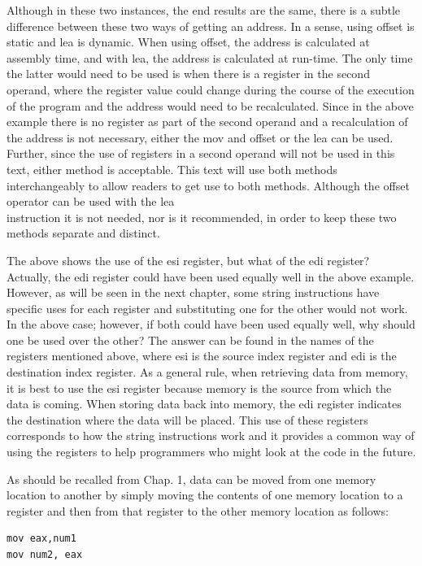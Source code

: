 \documentclass[10pt]{book}
\begin{document}
Although in these two instances, the end results are the same, there is a subtle difference between these two ways of getting an address. In a sense, using offset is static and lea is dynamic. When using offset, the address is calculated at assembly time, and with lea, the address is calculated at run-time. The only time the latter would need to be used is when there is a register in the second operand, where the register value could change during the course of the execution of the program and the address would need to be recalculated. Since in the above example there is no register as part of the second operand and a recalculation of the address is not necessary, either the mov and offset or the lea can be used. Further, since the use of registers in a second operand will not be used in this text, either method is acceptable. This text will use both methods interchangeably to allow readers to get use to both methods. Although the offset operator can be used with the lea\\
instruction it is not needed, nor is it recommended, in order to keep these two methods separate and distinct.

The above shows the use of the esi register, but what of the edi register? Actually, the edi register could have been used equally well in the above example. However, as will be seen in the next chapter, some string instructions have specific uses for each register and substituting one for the other would not work. In the above case; however, if both could have been used equally well, why should one be used over the other? The answer can be found in the names of the registers mentioned above, where esi is the source index register and edi is the destination index register. As a general rule, when retrieving data from memory, it is best to use the esi register because memory is the source from which the data is coming. When storing data back into memory, the edi register indicates the destination where the data will be placed. This use of these registers corresponds to how the string instructions work and it provides a common way of using the registers to help programmers who might look at the code in the future.

As should be recalled from Chap. 1, data can be moved from one memory location to another by simply moving the contents of one memory location to a register and then from that register to the other memory location as follows:

\begin{verbatim}
mov eax,num1
mov num2, eax
\end{verbatim}
\end{document}
